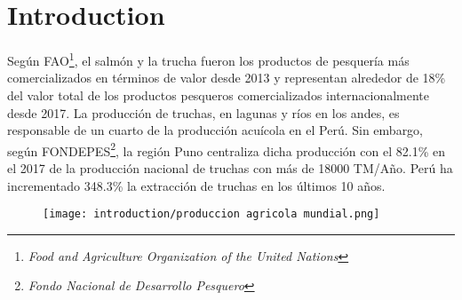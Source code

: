 \chapter*{\centering \large Introduction} 

\begin{spacing}{1.5}{Según FAO\footnote{\textit{Food and Agriculture Organization of the United Nations}}, el salmón y la trucha fueron los productos de pesquería más comercializados en términos de valor desde 2013 y representan alrededor de 18\% del valor total de los productos pesqueros comercializados internacionalmente desde 2017. \cite{FAO2017} La producción de truchas, en lagunas y ríos en los andes, es responsable de un cuarto de la producción acuícola en el Perú.  \cite{SeafoodTradeIntelligencePortal2018} Sin embargo, según FONDEPES\footnote{\textit{Fondo Nacional de Desarrollo Pesquero}}, la región Puno centraliza dicha producción con el 82.1\% en el 2017 de la producción nacional de truchas con más de 18000 TM/Año. \cite{FONDEPES2014} Perú ha incrementado 348.3\% la extracción de truchas en los últimos 10 años. \cite{MinisteriodelaProducciondelPeru2018}}
\end{spacing}

  \vspace{1.5cm}
\begin{figure}[H]
	\centering
	\texttt{[image: introduction/produccion agricola mundial.png]}
\end{figure}